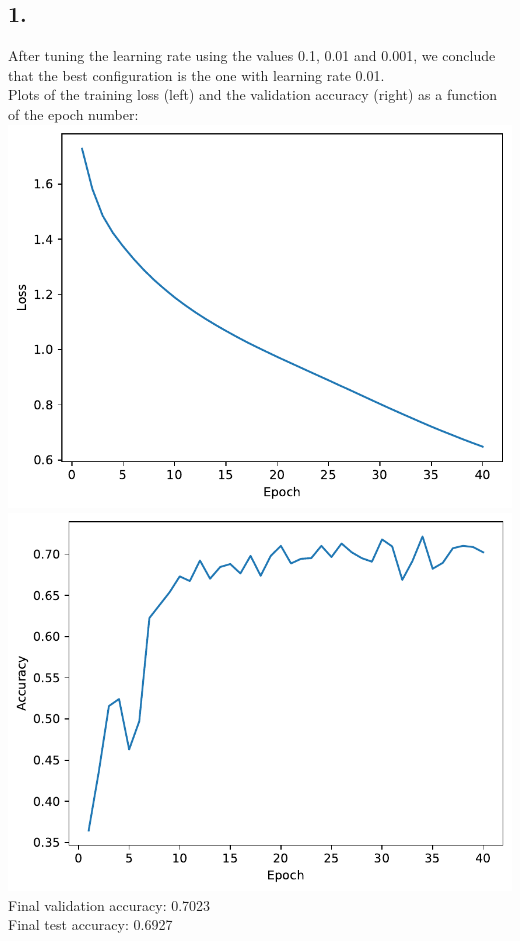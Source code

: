 \documentclass[12pt,a4paper]{article}
\begin{document}
    \subsection{1.}
        After tuning the learning rate using the values 0.1, 0.01 and 0.001, we conclude that the best configuration is the one with learning rate 0.01. \\
        Plots of the training loss (left) and the validation accuracy (right) as a function of the epoch number: \\
        \includegraphics[width=\imagewidth]{q2/q2_1_lr-0.01-train-loss.pdf}
        \includegraphics[width=\imagewidth]{q2/q2_1_lr-0.01-valid-accuracy.pdf} \\
        Final validation accuracy: 0.7023 \\
        Final test accuracy: 0.6927
\end{document}

